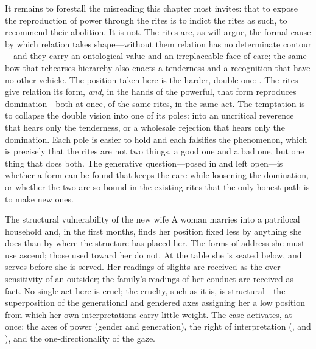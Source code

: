  It remains to forestall the misreading this chapter most invites: that to expose the reproduction of power through the rites is to indict the rites as such, to recommend their abolition. It is not. The rites are, as  will argue, the formal cause by which relation takes shape---without them relation has no determinate contour---and they carry an ontological value and an irreplaceable face of care; the same bow that rehearses hierarchy also enacts a tenderness and a recognition that have no other vehicle. The position taken here is the harder, double one: . The rites give relation its form, \emph{and}, in the hands of the powerful, that form reproduces domination---both at once, of the same rites, in the same act. The temptation is to collapse the double vision into one of its poles: into an uncritical reverence that hears only the tenderness, or a wholesale rejection that hears only the domination. Each pole is easier to hold and each falsifies the phenomenon, which is precisely that the rites are not two things, a good one and a bad one, but one thing that does both. The generative question---posed in  and left open---is whether a form can be found that keeps the care while loosening the domination, or whether the two are so bound in the existing rites that the only honest path is to make new ones.

\begin{casebox}{The structural vulnerability of the new wife}
A woman marries into a patrilocal household and, in the first months, finds her position fixed less by anything she does than by where the structure has placed her. The forms of address she must use ascend; those used toward her do not. At the table she is seated below, and serves before she is served. Her readings of slights are received as the over-sensitivity of an outsider; the family's readings of her conduct are received as fact. No single act here is cruel; the cruelty, such as it is, is structural---the superposition of the generational and gendered axes assigning her a low position from which her own interpretations carry little weight. The case activates, at once: the axes of power (gender and generation), the right of interpretation (, and ), and the one-directionality of the gaze.
\end{casebox}

